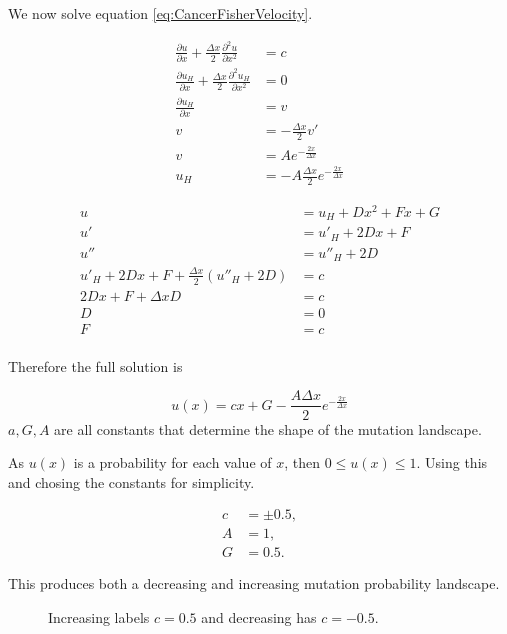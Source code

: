\documentclass{standalone}
\begin{document}
We now solve equation \eqref{eq:CancerFisherVelocity}. 

\begin{align*}
\frac{\partial u}{\partial x} + \frac{\Delta x}{2} \frac{\partial ^2 u}{\partial x ^2} & = c \\
\frac{\partial u_H}{\partial x} + \frac{\Delta x}{2} \frac{\partial ^2 u_H}{\partial x ^2} & = 0 \\
\frac{\partial u_H}{\partial x} & = v \\
v & = - \frac{\Delta x}{2} v' \\ 
v & = A e ^{- \frac{2x}{\Delta x}} \\
u _H & = - A \frac{\Delta x}{2} e ^{- \frac{2x}{\Delta x}}
\end{align*}

\begin{align*}
u & = u _H + D x^2 + F x + G \\
u' & = u' _H + 2D x + F \\
u'' & = u'' _H + 2D \\
u' _H + 2D x + F + \frac{\Delta x}{2} \left( u'' _H + 2D \right) & = c \\
2Dx + F + \Delta x D & = c \\
D & = 0 \\
F & = c \\
\end{align*}

Therefore the full solution is 

\begin{equation}
u(x)  = c x  + G - \frac{A \Delta x}{2} e^{- \frac{2x}{\Delta x}}
\end{equation}
$a, G, A$ are all constants that determine the shape of the mutation landscape. 

As $u(x)$ is a probability for each value of $x$, then $ 0 \leq u(x) \leq 1 $. Using this and chosing the constants for simplicity. 

\begin{align*}
c & = \pm 0.5, \\
A & = 1, \\
G & = 0.5. 
\end{align*}

This produces both a decreasing and increasing mutation probability landscape. 

\begin{figure}[H]
\centering

\caption{Increasing labels $c =0.5$ and decreasing has $c=-0.5$. }
\end{figure}
\end{document}
